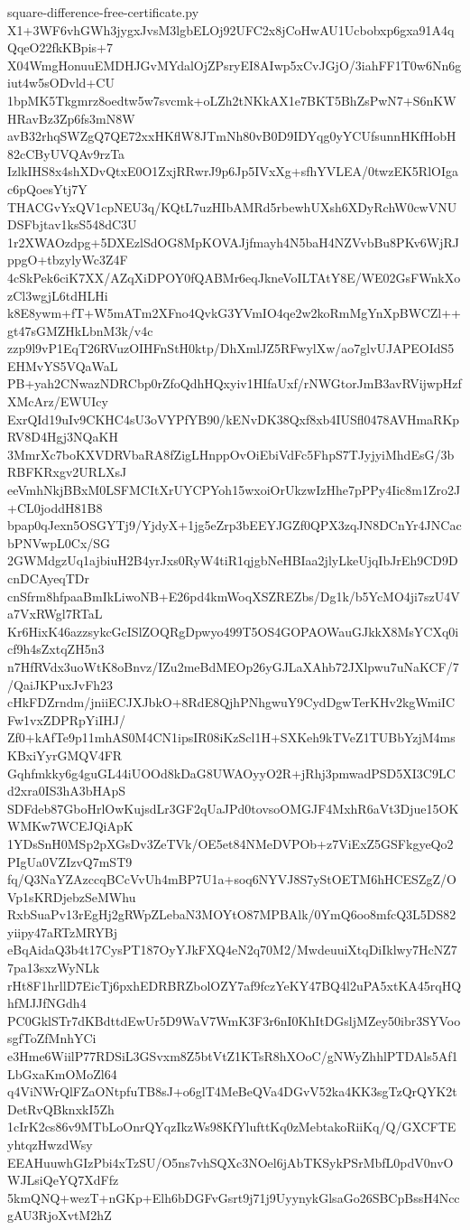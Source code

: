 \documentclass[11pt]{article}
\theoremstyle{definition}
\theoremstyle{remark}
\begin{document}
\begin{filecontents*}[overwrite]{square-difference-free-certificate.py}
X1+3WF6vhGWh3jygxJvsM3lgbELOj92UFC2x8jCoHwAU1Ucbobxp6gxa91A4qQqeO22fkKBpis+7
X04WmgHonuuEMDHJGvMYdalOjZPsryEI8AIwp5xCvJGjO/3iahFF1T0w6Nn6giut4w5sODvld+CU
1bpMK5Tkgmrz8oedtw5w7svcmk+oLZh2tNKkAX1e7BKT5BhZsPwN7+S6nKWHRavBz3Zp6fs3mN8W
avB32rhqSWZgQ7QE72xxHKflW8JTmNh80vB0D9IDYqg0yYCUfsunnHKfHobH82cCByUVQAv9rzTa
IzlkIHS8x4shXDvQtxE0O1ZxjRRwrJ9p6Jp5IVxXg+sfhYVLEA/0twzEK5RlOIgac6pQoesYtj7Y
THACGvYxQV1cpNEU3q/KQtL7uzHIbAMRd5rbewhUXsh6XDyRchW0cwVNUDSFbjtav1ksS548dC3U
1r2XWAOzdpg+5DXEzlSdOG8MpKOVAJjfmayh4N5baH4NZVvbBu8PKv6WjRJppgO+tbzylyWc3Z4F
4cSkPek6ciK7XX/AZqXiDPOY0fQABMr6eqJkneVoILTAtY8E/WE02GsFWnkXozCl3wgjL6tdHLHi
k8E8ywm+fT+W5mATm2XFno4QvkG3YVmIO4qe2w2koRmMgYnXpBWCZl++gt47sGMZHkLbnM3k/v4c
zzp9l9vP1EqT26RVuzOIHFnStH0ktp/DhXmlJZ5RFwylXw/ao7glvUJAPEOIdS5EHMvYS5VQaWaL
PB+yah2CNwazNDRCbp0rZfoQdhHQxyiv1HIfaUxf/rNWGtorJmB3avRVijwpHzfXMcArz/EWUIcy
ExrQId19uIv9CKHC4sU3oVYPfYB90/kENvDK38Qxf8xb4IUSfl0478AVHmaRKpRV8D4Hgj3NQaKH
3MmrXc7boKXVDRVbaRA8fZigLHnppOvOiEbiVdFc5FhpS7TJyjyiMhdEsG/3bRBFKRxgv2URLXsJ
eeVmhNkjBBxM0LSFMCItXrUYCPYoh15wxoiOrUkzwIzHhe7pPPy4Iic8m1Zro2J+CL0joddH81B8
bpap0qJexn5OSGYTj9/YjdyX+1jg5eZrp3bEEYJGZf0QPX3zqJN8DCnYr4JNCacbPNVwpL0Cx/SG
2GWMdgzUq1ajbiuH2B4yrJxs0RyW4tiR1qjgbNeHBIaa2jlyLkeUjqIbJrEh9CD9DcnDCAyeqTDr
cnSfrm8hfpaaBmIkLiwoNB+E26pd4kmWoqXSZREZbs/Dg1k/b5YcMO4ji7szU4Va7VxRWgl7RTaL
Kr6HixK46azzsykcGcISlZOQRgDpwyo499T5OS4GOPAOWauGJkkX8MsYCXq0icf9h4sZxtqZH5n3
n7HfRVdx3uoWtK8oBnvz/IZu2meBdMEOp26yGJLaXAhb72JXlpwu7uNaKCF/7/QaiJKPuxJvFh23
cHkFDZrndm/jniiECJXJbkO+8RdE8QjhPNhgwuY9CydDgwTerKHv2kgWmiICFw1vxZDPRpYiIHJ/
Zf0+kAfTe9p11mhAS0M4CN1ipsIR08iKzScl1H+SXKeh9kTVeZ1TUBbYzjM4msKBxiYyrGMQV4FR
Gqhfmkky6g4guGL44iUOOd8kDaG8UWAOyyO2R+jRhj3pmwadPSD5XI3C9LCd2xra0IS3hA3bHApS
SDFdeb87GboHrlOwKujsdLr3GF2qUaJPd0tovsoOMGJF4MxhR6aVt3Djue15OKWMKw7WCEJQiApK
1YDsSnH0MSp2pXGsDv3ZeTVk/OE5et84NMeDVPOb+z7ViExZ5GSFkgyeQo2PIgUa0VZIzvQ7mST9
fq/Q3NaYZAzccqBCcVvUh4mBP7U1a+soq6NYVJ8S7yStOETM6hHCESZgZ/OVp1sKRDjebzSeMWhu
RxbSuaPv13rEgHj2gRWpZLebaN3MOYtO87MPBAlk/0YmQ6oo8mfcQ3L5DS82yiipy47aRTzMRYBj
eBqAidaQ3b4t17CysPT187OyYJkFXQ4eN2q70M2/MwdeuuiXtqDiIklwy7HcNZ77pa13sxzWyNLk
rHt8F1hrllD7EicTj6pxhEDRBRZbolOZY7af9fczYeKY47BQ4l2uPA5xtKA45rqHQhfMJJfNGdh4
PC0GklSTr7dKBdttdEwUr5D9WaV7WmK3F3r6nI0KhItDGsljMZey50ibr3SYVoosgfToZfMnhYCi
e3Hme6WiilP77RDSiL3GSvxm8Z5btVtZ1KTsR8hXOoC/gNWyZhhlPTDAls5Af1LbGxaKmOMoZl64
q4ViNWrQlFZaONtpfuTB8sJ+o6glT4MeBeQVa4DGvV52ka4KK3sgTzQrQYK2tDetRvQBknxkI5Zh
1cIrK2cs86v9MTbLoOnrQYqzIkzWs98KfYlufttKq0zMebtakoRiiKq/Q/GXCFTEyhtqzHwzdWsy
EEAHuuwhGIzPbi4xTzSU/O5ns7vhSQXc3NOel6jAbTKSykPSrMbfL0pdV0nvOWJLsiQeYQ7XdFfz
5kmQNQ+wezT+nGKp+Elh6bDGFvGsrt9j71j9UyynykGlsaGo26SBCpBssH4NccgAU3RjoXvtM2hZ

\end{filecontents*}
\end{document}
